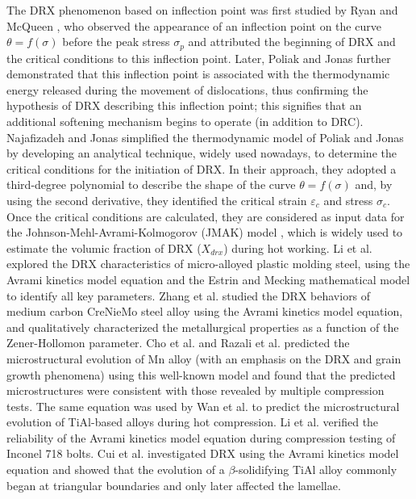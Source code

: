 \documentclass[metals,article,submit,pdftex,moreauthors]{Definitions/mdpi}
\makeatletter
\DeclareRobustCommand{\eal}{et al.\@\xspace}
\makeatother
\begin{document}
The DRX phenomenon based on inflection point was first studied by Ryan and McQueen \cite{ryan1989dynamic,ryan1990dynamic,ryan1990flow}, who observed the appearance of an inflection point on the curve $\theta=f(\sigma)$ before the peak stress $\sigma_p$ and attributed the beginning of DRX and the critical conditions to this inflection point. Later, Poliak and Jonas \cite{Poliak-1996,ei2003initiation,ei2003critical,jonas2003critical} further demonstrated that this inflection point is associated with the thermodynamic energy released during the movement of dislocations, thus confirming the hypothesis of DRX describing this inflection point; this signifies that an additional softening mechanism begins to operate (in addition to DRC). Najafizadeh and Jonas \cite{najafizadeh2006predicting} simplified the thermodynamic model of Poliak and Jonas by developing an analytical technique, widely used nowadays, to determine the critical conditions for the initiation of DRX. In their approach, they adopted a third-degree polynomial to describe the shape of the curve $\theta=f(\sigma)$ and, by using the second derivative, they identified the critical strain $\varepsilon_c$ and stress $\sigma_c$. Once the critical conditions are calculated, they are considered as input data for the Johnson-Mehl-Avrami-Kolmogorov (JMAK) model \cite{Avrami-1939}, which is widely used to estimate the volumic fraction of DRX ($X_{drx}$) during hot working. Li \eal \cite{li2015experimental} explored the DRX characteristics of micro-alloyed plastic molding steel, using the Avrami kinetics model equation and the Estrin and Mecking mathematical model \cite{estrin1984unified,mecking1981kinetics} to identify all key parameters. Zhang \eal \cite{zhang2016kinetics} studied the DRX behaviors of medium carbon CreNieMo steel alloy using the Avrami kinetics model equation, and qualitatively characterized the metallurgical properties as a function of the Zener-Hollomon parameter. Cho \eal \cite{cho2005prediction} and Razali \eal \cite{razali2021new} predicted the microstructural evolution of Mn alloy (with an emphasis on the DRX and grain growth phenomena) using this well-known model and found that the predicted microstructures were consistent with those revealed by multiple compression tests. The same equation was used by Wan \eal \cite{wan2017experimental} to predict the microstructural evolution of TiAl-based alloys during hot compression. Li \eal \cite{li2018finite} verified the reliability of the Avrami kinetics model equation during compression testing of Inconel 718 bolts. Cui \eal \cite{cui2016hot} investigated DRX using the Avrami
kinetics model equation and showed that the evolution of a $\beta$-solidifying TiAl alloy commonly began at triangular boundaries and only later affected the lamellae. 
\end{document}
